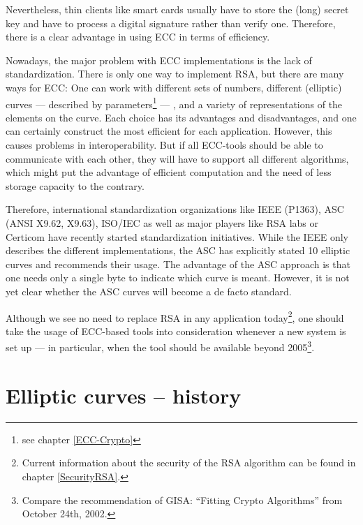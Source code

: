 Nevertheless, thin clients like smart cards usually have to store the (long)
secret key and have to process a digital signature rather than verify one.
Therefore, there is a clear advantage in using ECC in terms of efficiency.
\par
\smallskip
Nowadays, the major problem with ECC implementations is the lack of standardization.
There is only one way to implement RSA, but there are many ways for ECC: One can work with
different sets of numbers, different (elliptic) curves --- described by parameters\footnote{%
see chapter \ref{ECC-Crypto}
} --- ,
and a variety of representations of the elements on the curve. Each choice has its
advantages and disadvantages, and one can certainly construct the most efficient for
each application. However, this causes problems in interoperability. But if all
ECC-tools should be able to communicate with each other, they will have to support
all different algorithms, which might put the advantage of efficient computation and
the need of less storage capacity to the contrary.

\begin{sloppypar}
Therefore, international standardization organizations like IEEE (P1363),
ASC (ANSI X9.62, X9.63), ISO/IEC as well as major players like RSA labs or
Certicom have recently started standardization initiatives. While the IEEE
only describes the different implementations, the ASC has explicitly stated
10 elliptic curves and recommends their usage. The advantage of the ASC
approach is that one needs only a single byte to indicate which curve is
meant. However, it is not yet clear whether the ASC curves will become a de
facto standard.
\end{sloppypar}

Although we see no need to replace RSA in any application today\footnote{%
Current information about the security of the RSA algorithm can be found in 
chapter \ref{SecurityRSA}.}, one should
take the usage of ECC-based tools into consideration whenever a new system
is set up --- in particular, when the tool should be available beyond 2005\footnote{%
Compare the recommendation of GISA: ``Fitting Crypto Algorithms'' from October 24th, 2002.
}.


\section{Elliptic curves -- history}

